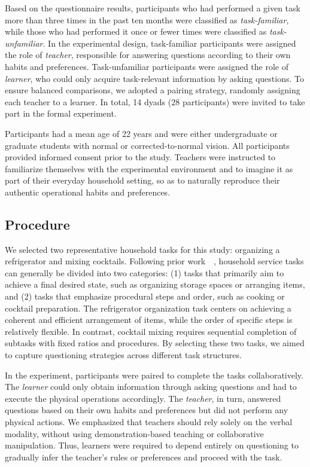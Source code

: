 \documentclass[sigconf,authordraft]{acmart}
\begin{document}
Based on the questionnaire results, participants who had performed a given task more than three times in the past ten months were classified as \textit{task-familiar}, while those who had performed it once or fewer times were classified as \textit{task-unfamiliar}. In the experimental design, task-familiar participants were assigned the role of \textit{teacher}, responsible for answering questions according to their own habits and preferences. Task-unfamiliar participants were assigned the role of \textit{learner}, who could only acquire task-relevant information by asking questions. To ensure balanced comparisons, we adopted a pairing strategy, randomly assigning each teacher to a learner. In total, 14 dyads (28 participants) were invited to take part in the formal experiment. 

Participants had a mean age of 22 years and were either undergraduate or graduate students with normal or corrected-to-normal vision. All participants provided informed consent prior to the study. Teachers were instructed to familiarize themselves with the experimental environment and to imagine it as part of their everyday household setting, so as to naturally reproduce their authentic operational habits and preferences.


\subsection{Procedure}
We selected two representative household tasks for this study: organizing a refrigerator and mixing cocktails. Following prior work~\cite{dai2024think}~\cite{racca2018active}, household service tasks can generally be divided into two categories: (1) tasks that primarily aim to achieve a final desired state, such as organizing storage spaces or arranging items, and (2) tasks that emphasize procedural steps and order, such as cooking or cocktail preparation. The refrigerator organization task centers on achieving a coherent and efficient arrangement of items, while the order of specific steps is relatively flexible. In contrast, cocktail mixing requires sequential completion of subtasks with fixed ratios and procedures. By selecting these two tasks, we aimed to capture questioning strategies across different task structures. 

In the experiment, participants were paired to complete the tasks collaboratively. The \textit{learner} could only obtain information through asking questions and had to execute the physical operations accordingly. The \textit{teacher}, in turn, answered questions based on their own habits and preferences but did not perform any physical actions. We emphasized that teachers should rely solely on the verbal modality, without using demonstration-based teaching or collaborative manipulation. Thus, learners were required to depend entirely on questioning to gradually infer the teacher’s rules or preferences and proceed with the task. 
\end{document}
